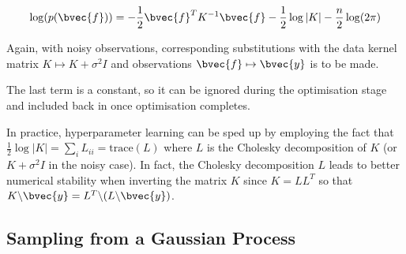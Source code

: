 			\begin{equation}
				\log(p(\bvec{f})) = - \frac{1}{2} \bvec{f}^{T} K^{-1} \bvec{f} - \frac{1}{2} \log|K| - \frac{n}{2} \log(2 \pi)
			\label{Background:GaussianProcess:Equation:LogMarginalLikelihood}
			\end{equation}
			
			Again, with noisy observations, corresponding substitutions with the data kernel matrix $K \mapsto K + \sigma^{2} I$ and observations $\bvec{f} \mapsto \bvec{y}$ is to be made.
			
			The last term is a constant, so it can be ignored during the optimisation stage and included back in once optimisation completes.
			
			In practice, hyperparameter learning can be sped up by employing the fact that $\frac{1}{2} \log|K| = \sum_{i} L_{ii} = \mathrm{trace}(L)$ where $L$ is the Cholesky decomposition of $K$ (or $K + \sigma^{2} I$ in the noisy case). In fact, the Cholesky decomposition $L$ leads to better numerical stability when inverting the matrix $K$ since $K = LL^{T}$ so that $K \backslash \bvec{y} = L^{T} \backslash (L \backslash \bvec{y})$.
		
		\subsection{Sampling from a Gaussian Process}
		
%			
%				
%				
			
